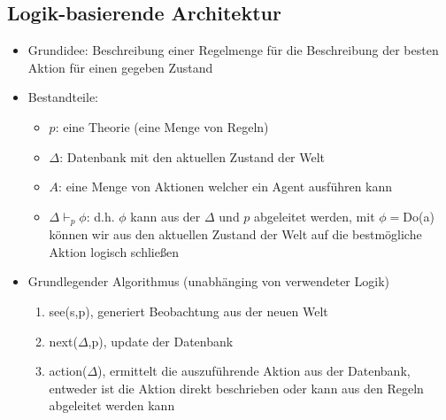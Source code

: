\documentclass{article} %
\begin{document}
	\subsection{Logik-basierende Architektur}
	\begin{itemize}
		\item Grundidee: Beschreibung einer Regelmenge für die Beschreibung der besten Aktion für einen gegeben Zustand
		\item Bestandteile:
		\begin{itemize}
			\item $p$: eine Theorie (eine Menge von Regeln)
			\item $\Delta$: Datenbank mit den aktuellen Zustand der Welt
			\item $A$: eine Menge von Aktionen welcher ein Agent ausführen kann
			\item $\Delta\vdash_{p}\phi$: d.h. $\phi$ kann aus der $\Delta$ und $p$ abgeleitet werden, mit $\phi=$Do(a) können wir aus den aktuellen Zustand der Welt auf die bestmögliche Aktion logisch schließen
		\end{itemize}
		 \item Grundlegender Algorithmus (unabhänging von verwendeter Logik)
		 \begin{enumerate}
		 	\item see(s,p), generiert Beobachtung aus der neuen Welt
		 	\item next($\Delta$,p), update der Datenbank
		 	\item action($\Delta$), ermittelt die auszuführende Aktion aus der Datenbank, entweder ist die Aktion direkt beschrieben oder kann aus den Regeln abgeleitet werden kann
		 \end{enumerate}
	\end{itemize}
\end{document}
